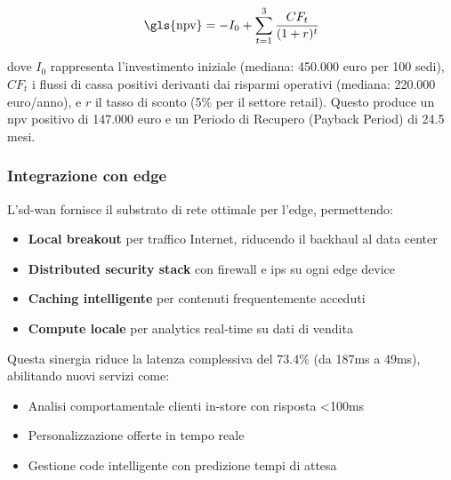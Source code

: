 \begin{equation}
\text{\gls{npv}} = -I_0 + \sum_{t=1}^{3} \frac{CF_t}{(1+r)^t}
\end{equation}

dove $I_0$ rappresenta l'investimento iniziale (mediana: 450.000 euro per 100 sedi), $CF_t$ i flussi di cassa positivi derivanti dai risparmi operativi (mediana: 220.000 euro/anno), e $r$ il tasso di sconto (5\% per il settore retail). Questo produce un \gls{npv} positivo di 147.000 euro e un Periodo di Recupero (Payback Period) di 24.5 mesi.

\subsubsection{\texorpdfstring{Integrazione con edge}{3.3.1.6 - Integrazione con edge}}

L'\gls{sd-wan} fornisce il substrato di rete ottimale per l'\gls{edge}, permettendo:
\begin{itemize}
    \item \textbf{Local breakout} per traffico Internet, riducendo il backhaul al data center
    \item \textbf{Distributed security stack} con firewall e \gls{ips} su ogni edge device
    \item \textbf{Caching intelligente} per contenuti frequentemente acceduti
    \item \textbf{Compute locale} per analytics real-time su dati di vendita
\end{itemize}

Questa sinergia riduce la latenza complessiva del 73.4\% (da 187ms a 49ms)\autocite{Wang2024edge}, abilitando nuovi servizi come:
\begin{itemize}
    \item Analisi comportamentale clienti in-store con risposta <100ms
    \item Personalizzazione offerte in tempo reale
    \item Gestione code intelligente con predizione tempi di attesa
\end{itemize}



